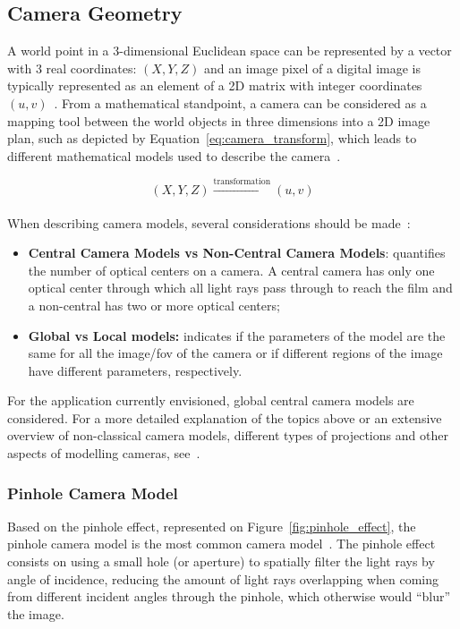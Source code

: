 \subsection{Camera Geometry}
\label{subsec:sota:camera-geometry}
A world point in a 3-dimensional Euclidean space can be represented by a vector with 3 real coordinates: $(X, Y, Z)$ and an image pixel of a digital image is typically represented as an element of a 2D matrix with integer coordinates $(u, v)$~\cite{mvg_book}. From a mathematical standpoint, a camera can be considered as a mapping tool between the world objects in three dimensions into a 2D image plan, such as depicted by Equation~\eqref{eq:camera_transform}, which leads to different mathematical models used to describe the camera~\cite{mvg_book, Sturm2010}.

\begin{equation}
	\label{eq:camera_transform}
	(X, Y, Z) \xrightarrow[]{\text{transformation}} (u, v)
\end{equation}

When describing camera models, several considerations should be made~\cite{Sturm2010}:
\begin{itemize}
	\item \textbf{Central Camera Models vs Non-Central Camera Models}: quantifies the number of optical centers on a camera. A central camera has only one optical center through which all light rays pass through to reach the film and a non-central has two or more optical centers;
	\item \textbf{Global vs Local models:} indicates if the parameters of the model are the same for all the image/\ac{fov} of the camera or if different regions of the image have different parameters, respectively.
\end{itemize}

For the application currently envisioned, global central camera models are considered. For a more detailed explanation of the topics above or an extensive overview of non-classical camera models, different types of projections and other aspects of modelling cameras, see~\cite{Sturm2010, camera_models}.

\subsubsection{Pinhole Camera Model}
Based on the pinhole effect, represented on Figure~\ref{fig:pinhole_effect}, the pinhole camera model is the most common camera model~\cite{camera_models}. The pinhole effect consists on using a small hole (or aperture) to spatially filter the light rays by angle of incidence, reducing the amount of light rays overlapping when coming from different incident angles through the pinhole, which otherwise would ``blur'' the image. 

